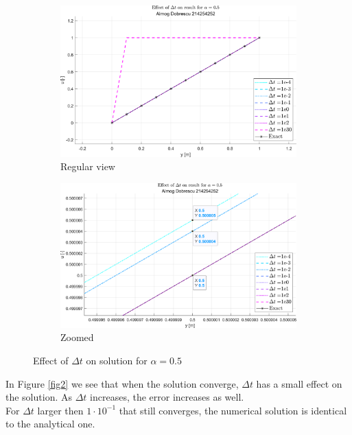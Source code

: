 \documentclass[11pt, a4paper]{article}
\begin{document}
\begin{figure}[H]
    \centering
    \begin{subfigure}[b]{.49\textwidth}
        \centering
        \includegraphics[width=\textwidth]{images/grap5.1.png}
        \caption{Regular view}
        \label{fig4A}
    \end{subfigure}
    \hfill
    \begin{subfigure}[b]{.49\textwidth}
        \centering
        \includegraphics[width=\textwidth]{images/grap5.2.png}
        \caption{Zoomed}
        \label{fig4B}
    \end{subfigure}
    \caption{Effect of $\Delta t$ on solution for $\alpha =0.5$}
    \label{fig4}
\end{figure}
\noindent In Figure \ref{fig2} we see that when the solution converge, $\Delta t$ has a small effect on the solution. As $\Delta t$ increases, the error increases as well.\\
For $\Delta t$ larger then $1\cdot10^{-1}$ that still converges, the numerical solution is identical to the analytical one.
\end{document}
